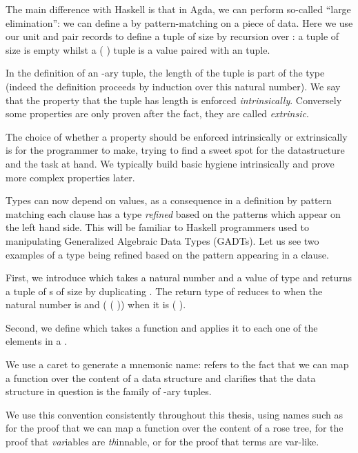 The main difference with Haskell is that in Agda, we can perform so-called
``large elimination'': we can define a  by pattern-matching on a
piece of data. Here we use our unit and pair records to define a tuple of
size  by recursion over : a tuple of size  is empty
whilst a ( ) tuple is a value paired with an  tuple.


\begin{technique}
In the definition of an -ary tuple, the length of the tuple is part
of the type (indeed the definition proceeds by induction over this natural
number). We say that the property that the tuple has length  is
enforced \emph{intrinsically}. Conversely some properties are only proven
after the fact, they are called \emph{extrinsic}.

The choice of whether a property should be enforced intrinsically or
extrinsically is for the programmer to make, trying to find a sweet
spot for the datastructure and the task at hand. We typically build
basic hygiene intrinsically and prove more complex properties later.
\end{technique}


Types can now depend on values, as a consequence in a definition by pattern
matching each clause has a type \emph{refined} based on the patterns which appear
on the left hand side. This will be familiar to Haskell programmers used to
manipulating Generalized Algebraic Data Types (GADTs). Let us see two examples of
a type being refined based on the pattern appearing in a clause.

First, we introduce  which takes a natural number  and a value
 of type  and returns a tuple of s of size  by duplicating
. The return type of  reduces to  when the natural number
is  and (  (  )) when it is
( ).


Second, we define  which takes a function and
applies it to each one of the elements in a .

\begin{convention}
We use a caret to generate a mnemonic name:  refers to the fact
that we can map a function over the content of a data structure and
 clarifies that the data structure in question is the family
of -ary tuples.

We use this convention consistently throughout this thesis, using names
such as  for the proof that we can map a
function over the content of a rose tree, 
for the proof that \emph{var}iables are \emph{th}innable,
or  for the proof that terms are var-like.
\end{convention}

